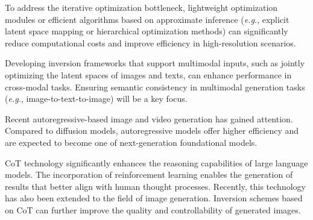 To address the iterative optimization bottleneck, lightweight optimization modules or efficient algorithms based on approximate inference (\textit{e.g.}, explicit latent space mapping or hierarchical optimization methods) can significantly reduce computational costs and improve efficiency in high-resolution scenarios.

Developing inversion frameworks that support multimodal inputs, such as jointly optimizing the latent spaces of images and texts, can enhance performance in cross-modal tasks. Ensuring semantic consistency in multimodal generation tasks (\textit{e.g.}, image-to-text-to-image) will be a key focus.

Recent autoregressive-based image and video generation has gained attention. Compared to diffusion models, autoregressive models offer higher efficiency and are expected to become one of next-generation foundational models.

CoT technology significantly enhances the reasoning capabilities of large language models. The incorporation of reinforcement learning enables the generation of results that better align with human thought processes. Recently, this technology has also been extended to the field of image generation. Inversion schemes based on CoT can further improve the quality and controllability of generated images. 

